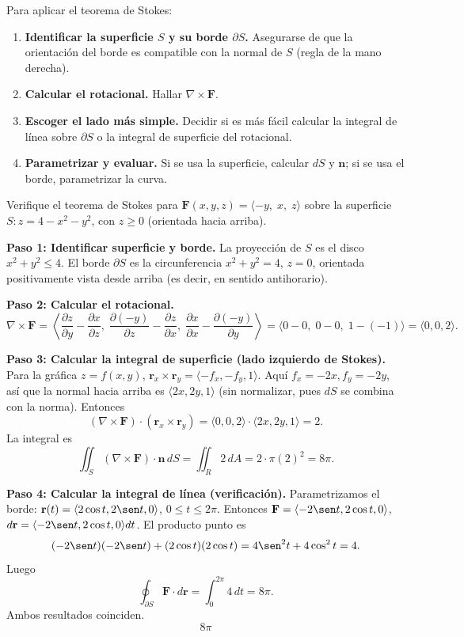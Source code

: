 \begin{pasos}
Para aplicar el teorema de Stokes:
\begin{enumerate}
\item \textbf{Identificar la superficie $S$ y su borde $\partial S$.} Asegurarse de que la orientación del borde es compatible con la normal de $S$ (regla de la mano derecha).
\item \textbf{Calcular el rotacional.} Hallar $\nabla\times\mathbf{F}$.
\item \textbf{Escoger el lado más simple.} Decidir si es más fácil calcular la integral de línea sobre $\partial S$ o la integral de superficie del rotacional.
\item \textbf{Parametrizar y evaluar.} Si se usa la superficie, calcular $dS$ y $\mathbf{n}$; si se usa el borde, parametrizar la curva.
\end{enumerate}
\end{pasos}

\begin{example}
Verifique el teorema de Stokes para $\mathbf{F}(x,y,z)=\langle -y,\; x,\; z\rangle$ sobre la superficie $S: z=4-x^2-y^2$, con $z\ge 0$ (orientada hacia arriba).
\begin{myproof}
\textbf{Paso 1: Identificar superficie y borde.}
La proyección de $S$ es el disco $x^2+y^2\le 4$. El borde $\partial S$ es la circunferencia $x^2+y^2=4$, $z=0$, orientada positivamente vista desde arriba (es decir, en sentido antihorario).

\textbf{Paso 2: Calcular el rotacional.}
\[
\nabla\times\mathbf{F}
=
\left\langle
\frac{\partial z}{\partial y}-\frac{\partial x}{\partial z},\;
\frac{\partial (-y)}{\partial z}-\frac{\partial z}{\partial x},\;
\frac{\partial x}{\partial x}-\frac{\partial (-y)}{\partial y}
\right\rangle
=
\langle 0-0,\;0-0,\;1-(-1)\rangle
=
\langle 0,0,2\rangle.
\]

\textbf{Paso 3: Calcular la integral de superficie (lado izquierdo de Stokes).}
Para la gráfica $z=f(x,y)$, $\mathbf{r}_x\times\mathbf{r}_y=\langle -f_x,-f_y,1\rangle$. Aquí $f_x=-2x, f_y=-2y$, así que la normal hacia arriba es $\langle 2x,2y,1\rangle$ (sin normalizar, pues $dS$ se combina con la norma). Entonces
\[
(\nabla\times\mathbf{F})\cdot(\mathbf{r}_x\times\mathbf{r}_y)
= \langle 0,0,2\rangle\cdot\langle 2x,2y,1\rangle = 2.
\]
La integral es
\[
\iint_S (\nabla\times\mathbf{F})\cdot\mathbf{n}\,dS
= \iint_R 2\,dA = 2\cdot \pi(2)^2 = 8\pi.
\]

\textbf{Paso 4: Calcular la integral de línea (verificación).}
Parametrizamos el borde: $\mathbf{r}(t)=\langle 2\cos t, 2\sen t, 0\rangle$, $0\le t\le 2\pi$. Entonces $\mathbf{F}=\langle -2\sen t, 2\cos t, 0\rangle$, $d\mathbf{r}=\langle -2\sen t, 2\cos t, 0\rangle dt$. El producto punto es
\[
(-2\sen t)(-2\sen t) + (2\cos t)(2\cos t) = 4\sen^2 t + 4\cos^2 t = 4.
\]
Luego
\[
\oint_{\partial S}\mathbf{F}\cdot d\mathbf{r} = \int_0^{2\pi} 4\,dt = 8\pi.
\]
Ambos resultados coinciden.
\[
\boxed{8\pi}
\]
\end{myproof}
\end{example}

